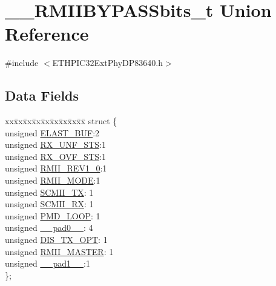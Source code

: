 \hypertarget{union_____r_m_i_i_b_y_p_a_s_sbits__t}{}\section{\+\_\+\+\_\+\+R\+M\+I\+I\+B\+Y\+P\+A\+S\+Sbits\+\_\+t Union Reference}
\label{union_____r_m_i_i_b_y_p_a_s_sbits__t}


{\ttfamily \#include $<$E\+T\+H\+P\+I\+C32\+Ext\+Phy\+D\+P83640.\+h$>$}

\subsection*{Data Fields}
\begin{DoxyCompactItemize}
\item 
\begin{tabbing}
xx\=xx\=xx\=xx\=xx\=xx\=xx\=xx\=xx\=\kill
struct \{\\
\>unsigned \hyperlink{union_____r_m_i_i_b_y_p_a_s_sbits__t_a587d3bc3a6b72615806422bb98b4b358}{ELAST\_BUF}:2\\
\>unsigned \hyperlink{union_____r_m_i_i_b_y_p_a_s_sbits__t_a6885d9bd271ec74616e7c66bf2b4bb97}{RX\_UNF\_STS}:1\\
\>unsigned \hyperlink{union_____r_m_i_i_b_y_p_a_s_sbits__t_a42892a1cd9bf8f9300de79e7027ab384}{RX\_OVF\_STS}:1\\
\>unsigned \hyperlink{union_____r_m_i_i_b_y_p_a_s_sbits__t_aa5de637fe9c35ea9f6bbfe246b269ad2}{RMII\_REV1\_0}:1\\
\>unsigned \hyperlink{union_____r_m_i_i_b_y_p_a_s_sbits__t_a20b8da6446fb0fd157b6fdeece4b4452}{RMII\_MODE}:1\\
\>unsigned \hyperlink{union_____r_m_i_i_b_y_p_a_s_sbits__t_aafd05844ea7f6b3cf33b9ad8fce95a76}{SCMII\_TX}: 1\\
\>unsigned \hyperlink{union_____r_m_i_i_b_y_p_a_s_sbits__t_a558ae6db9886c2133759eac093725642}{SCMII\_RX}: 1\\
\>unsigned \hyperlink{union_____r_m_i_i_b_y_p_a_s_sbits__t_a3be5386fcd1d8f5646ee4220e3c4843d}{PMD\_LOOP}: 1\\
\>unsigned \hyperlink{union_____r_m_i_i_b_y_p_a_s_sbits__t_adf71f3d8410c1f1dbbc96680a92c49af}{\_\_pad0\_\_}: 4\\
\>unsigned \hyperlink{union_____r_m_i_i_b_y_p_a_s_sbits__t_a82ce086b027e2a3915ee7e436222415d}{DIS\_TX\_OPT}: 1\\
\>unsigned \hyperlink{union_____r_m_i_i_b_y_p_a_s_sbits__t_a872c99cb33286299ac1594298f35efa9}{RMII\_MASTER}: 1\\
\>unsigned \hyperlink{union_____r_m_i_i_b_y_p_a_s_sbits__t_acaf2d0924a107ec6e8d2e31febaf66f9}{\_\_pad1\_\_}:1\\
\}; \\


\end{tabbing}
\end{DoxyCompactItemize}

